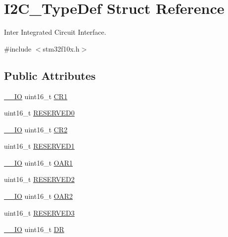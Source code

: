 \hypertarget{struct_i2_c___type_def}{\section{I2\-C\-\_\-\-Type\-Def Struct Reference}
\label{struct_i2_c___type_def}
}


Inter Integrated Circuit Interface.  




{\ttfamily \#include $<$stm32f10x.\-h$>$}

\subsection*{Public Attributes}
\begin{DoxyCompactItemize}
\item 
\hyperlink{group___c_m_s_i_s__core__definitions_gaec43007d9998a0a0e01faede4133d6be}{\-\_\-\-\_\-\-I\-O} uint16\-\_\-t \hyperlink{struct_i2_c___type_def_ad35ea0b199cefb757de20e9b78168534}{C\-R1}
\item 
uint16\-\_\-t \hyperlink{struct_i2_c___type_def_aee6ec4cf81ee0bb5b038576ba0d738a2}{R\-E\-S\-E\-R\-V\-E\-D0}
\item 
\hyperlink{group___c_m_s_i_s__core__definitions_gaec43007d9998a0a0e01faede4133d6be}{\-\_\-\-\_\-\-I\-O} uint16\-\_\-t \hyperlink{struct_i2_c___type_def_ac8bff45acc455489620d50e697a24c9d}{C\-R2}
\item 
uint16\-\_\-t \hyperlink{struct_i2_c___type_def_a6c3d147223993f2b832b508ee5a5178e}{R\-E\-S\-E\-R\-V\-E\-D1}
\item 
\hyperlink{group___c_m_s_i_s__core__definitions_gaec43007d9998a0a0e01faede4133d6be}{\-\_\-\-\_\-\-I\-O} uint16\-\_\-t \hyperlink{struct_i2_c___type_def_ad218fdcb9606477c1d63f8ee38d3c5c9}{O\-A\-R1}
\item 
uint16\-\_\-t \hyperlink{struct_i2_c___type_def_a5e98c83a176deeb4a8a68f9ca12fdfd2}{R\-E\-S\-E\-R\-V\-E\-D2}
\item 
\hyperlink{group___c_m_s_i_s__core__definitions_gaec43007d9998a0a0e01faede4133d6be}{\-\_\-\-\_\-\-I\-O} uint16\-\_\-t \hyperlink{struct_i2_c___type_def_a03189e2a57c81ae5d103739b72f52c93}{O\-A\-R2}
\item 
uint16\-\_\-t \hyperlink{struct_i2_c___type_def_a355b2c5aa0dd467de1f9dea4a9afe986}{R\-E\-S\-E\-R\-V\-E\-D3}
\item 
\hyperlink{group___c_m_s_i_s__core__definitions_gaec43007d9998a0a0e01faede4133d6be}{\-\_\-\-\_\-\-I\-O} uint16\-\_\-t \hyperlink{struct_i2_c___type_def_a5c1551b886fbb8e801b9203f6d7dc7c5}{D\-R}

\end{DoxyCompactItemize}
